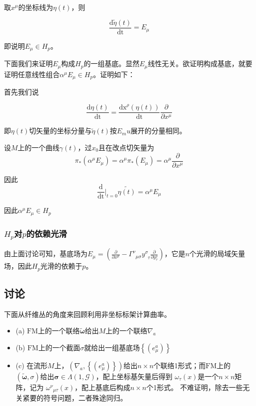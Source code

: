 \documentclass{ctexbook}
\begin{document}
取$x^{\mu}$的坐标线为$\eta(t)$，则

\begin{equation}
    \frac{\mathrm{d}\tilde{\eta}(t)}{\mathrm{dt}}=E_\mu
\end{equation}

即说明$E_\mu\in H_p$。

下面我们来证明$E_\mu$构成$H_p$的一组基底。显然$E_\mu$线性无关。欲证明构成基底，就要证明任意线性组合$\alpha^{\mu}E_\mu\in H_p$。证明如下：

首先我们说

\begin{equation}
    \frac{\mathrm{d}\eta(t)}{\mathrm{dt}}=\frac{\mathrm{dx}^{\rho}(\eta(t))}{\mathrm{dt}}\frac{\partial}{\partial x^{\mu}}
\end{equation}

即$\eta(t)$切矢量的坐标分量与$\tilde{\eta}(t)$按$E_mu$展开的分量相同。

设$M$上的一个曲线$\gamma(t)$，过$x_0$且在改点切矢量为\[\pi_{*}(\alpha^{\mu}E_\mu)=\alpha^{\mu}\pi_*(E_\mu)=\alpha^{\mu}\frac{\partial}{\partial x^{\mu}}\]

因此
\begin{equation}
    \frac{\mathrm{d}}{\mathrm{dt}}|_{t=0}\tilde{\eta(t)}=\alpha^{\mu}E_\mu
\end{equation}

因此$\alpha^{\mu}E_\mu\in H_p$



\subsubsection{$H_p$对$p$的依赖光滑}

由上面讨论可知，基底场为$E_\mu=\left(\frac{\partial}{\partial x^\mu}-\Gamma^{\nu}_{\;\;\mu\sigma}y^{\sigma}_{\;\;\tau}\frac{\partial}{\partial y^{\nu}_{\tau}}\right)$，它是$n$个光滑的局域矢量场，因此$H_p$光滑的依赖于$p$。

\subsection{讨论}

下面从纤维丛的角度来回顾利用非坐标标架计算曲率。
\begin{itemize}
    \item (a) $\mathrm{FM}$上的一个联络$\tilde{\bm{\omega}}$给出$M$上的一个联络$\nabla_a$
    \item (b) $\mathrm{FM}$上的一个截面$\sigma$就给出一组基底场$\left\{(e_{\mu}^a)\right\}$
    \item (c) 在流形$M$上，$(\nabla_a,\left\{(e_{\mu}^a)\right\})$给出$n\times n$个联络1形式；而$\mathrm{FM}$上的$(\tilde{\bm{\omega}},\sigma)$给出$\bm{\sigma}\in \Lambda(1,\mathscr{G})$，配上坐标基矢量后得到 $\omega_{\tau}(x)$是一个$n\times n$矩阵，记为 $\omega^{\nu}_{\;\;\mu\tau}(x)$，配上基底后构成$n\times n$个1形式。 不难证明，除去一些无关紧要的符号问题，二者殊途同归。
\end{itemize}
\end{document}
